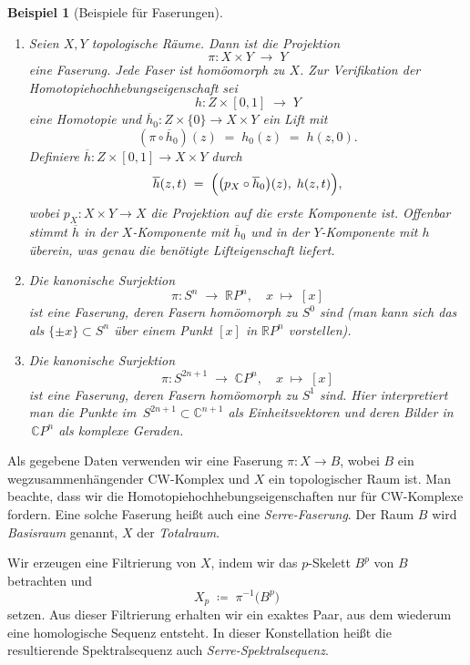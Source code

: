 \documentclass[12pt, hidelinks]{article}
\numberwithin{conj}{section}
\newtheorem{example}[conj]{Beispiel}
\begin{document}
\begin{example}[Beispiele für Faserungen]\label{examplesFibrations}
\begin{enumerate}[nolistsep]
    \item Seien \(X,Y\) topologische Räume. Dann ist die Projektion
    \[
        \pi : X \times Y \;\longrightarrow\; Y
    \]
    eine Faserung. Jede Faser ist homöomorph zu \(X\). Zur Verifikation der Homotopiehochhebungseigenschaft sei
    \[
        h : Z \times [0,1] \;\longrightarrow\; Y
    \]
    eine Homotopie und \(\overline{h}_0 : Z \times \{0\} \to X \times Y\) ein Lift mit 
    \[
        (\pi \circ \overline{h}_0)(z) \;=\; h_0(z) \;=\; h(z,0).
    \]
    Definiere \(\overline{h} : Z \times [0,1] \to X \times Y\) durch
    \[
        \overline{h}(z,t)
        \;=\;
        \Bigl(\bigl(p_X \circ \overline{h}_0\bigr)(z),\; h(z,t)\Bigr),
    \]
    wobei \(p_X : X \times Y \to X\) die Projektion auf die erste Komponente ist. Offenbar stimmt \(\overline{h}\) in der \(X\)-Komponente mit \(\overline{h}_0\) und in der \(Y\)-Komponente mit \(h\) überein, was genau die benötigte Lifteigenschaft liefert.

    \item Die kanonische Surjektion 
    \[
        \pi : S^n \;\longrightarrow\; \mathbb{R}P^n,\quad x \;\mapsto\; [x]
    \]
    ist eine Faserung, deren Fasern homöomorph zu \(S^0\) sind (man kann sich das als \(\{\pm x\}\subset S^n\) über einem Punkt \([x]\) in \(\mathbb{R}P^n\) vorstellen).

    \item Die kanonische Surjektion 
    \[
        \pi : S^{2n+1} \;\longrightarrow\; \mathbb{C}P^n,\quad x \;\mapsto\; [x]
    \]
    ist eine Faserung, deren Fasern homöomorph zu \(S^1\) sind. Hier interpretiert man die Punkte im \(\,S^{2n+1}\subset \mathbb{C}^{n+1}\) als Einheitsvektoren und deren Bilder in \(\,\mathbb{C}P^n\) als komplexe Geraden.
\end{enumerate}
\end{example}

Als gegebene Daten verwenden wir eine Faserung \(\pi : X \to B\), wobei \(B\) ein wegzusammenhängender CW-Komplex und \(X\) ein topologischer Raum ist. Man beachte, dass wir die Homotopiehochhebungseigenschaften nur für CW-Komplexe fordern. Eine solche Faserung heißt auch eine \emph{Serre-Faserung}. Der Raum \(B\) wird \emph{Basisraum} genannt, \(X\) der \emph{Totalraum}. 

Wir erzeugen eine Filtrierung von \(X\), indem wir das \(p\)-Skelett \(B^p\) von \(B\) betrachten und
\[
    X_p \;\coloneqq\; \pi^{-1}\bigl(B^p\bigr)
\]
setzen. Aus dieser Filtrierung erhalten wir ein exaktes Paar, aus dem wiederum eine homologische Sequenz entsteht. In dieser Konstellation heißt die resultierende Spektralsequenz auch \emph{Serre-Spektralsequenz}.
\end{document}
